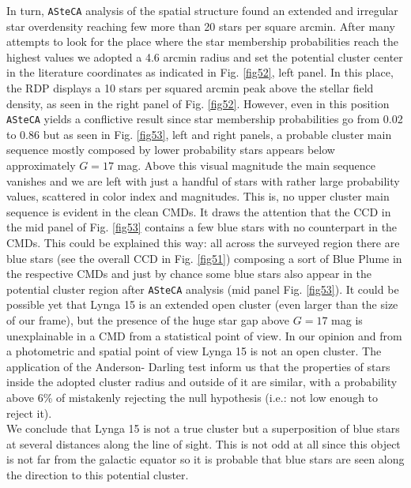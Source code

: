 \documentclass[draft]{aa}
\begin{document}
In turn, \texttt{ASteCA} analysis of the spatial structure found an extended and
irregular star overdensity reaching few more than 20 stars per square arcmin.
After many attempts to look for the place where the star membership
probabilities reach the highest values we adopted a 4.6 arcmin radius and set
the potential cluster center in the literature coordinates as indicated in Fig.
\ref{fig52}, left panel. In this place, the RDP displays a 10 stars per squared
arcmin peak above the stellar field density, as seen in the right panel of Fig. 
\ref{fig52}.
However, even in this position \texttt{ASteCA} yields a conflictive result
since star membership probabilities go from 0.02 to 0.86 but as seen in Fig. 
\ref{fig53}, left and right panels, a probable cluster main sequence mostly
composed by lower probability stars appears below approximately $G=17$ mag.
Above this visual magnitude the main sequence vanishes and we are left with
just a handful of stars with rather large probability values, scattered in
color index and magnitudes. This is, no upper cluster main sequence is
evident in the clean CMDs.
It draws the attention that the CCD in the mid panel of Fig. \ref{fig53}
contains a few blue stars with no counterpart in the CMDs.
This could be explained this way: all across the surveyed region there are blue
stars (see the overall CCD in Fig. \ref{fig51}) composing a sort of Blue Plume
in the respective CMDs and just by chance some blue stars also appear in the
potential cluster region after \texttt{ASteCA} analysis (mid panel Fig. 
\ref{fig53}). It could be possible yet that Lynga 15 is an
extended open cluster (even larger than the size of our frame), but the presence
of the huge star gap above $G=17$ mag is unexplainable in a CMD from a
statistical point of view. In our opinion and from a photometric and spatial
point of view Lynga 15 is not an open cluster. The application of the Anderson-
Darling test inform us that the properties of stars inside the adopted cluster
radius and outside of it are similar, with a probability above 6\% of
mistakenly rejecting the null hypothesis (i.e.: not low enough to reject it).\\

We conclude that Lynga 15 is not a true cluster but a superposition of blue
stars at several distances along the line of sight.
This is not odd at all since this object is not far from the galactic equator
so it is probable that blue stars are seen along the direction to this
potential cluster.
\end{document}
